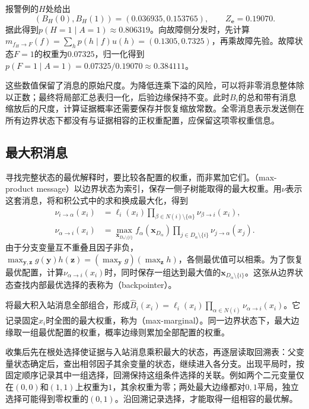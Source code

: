 报警例的$H$处给出
\begin{equation}
  (B_H(0),B_H(1))=(0.036935,0.153765),
  \qquad Z_{\bm{e}}=0.19070.
  \label{eq:pgm-junction-tree-alarm-normalizer}
\end{equation}
据此得到$p(H=1\mid A=1)\approx0.806319$。向故障侧分发时，先计算$m_{f_H\to F}(f)=\sum_h p(h\mid f)u(h)=(0.1305,0.7325)$，再乘故障先验。故障状态$F=1$的权重为$0.07325$，归一化得到$p(F=1\mid A=1)=0.07325/0.19070\approx0.384111$。

这些数值保留了消息的原始尺度。为降低连乘下溢的风险，可以将非零消息整体除以正数；最终将局部汇总表归一化，后验边缘保持不变。此时$B_i$的总和带有消息缩放后的尺度，计算证据概率还需要保存并恢复缩放常数。全零消息表示发送侧在所有边界状态下都没有与证据相容的正权重配置，应保留这项零权重信息。

\subsection{最大积消息}
\label{sec:pgm-junction-tree-max-product}

寻找完整状态的最优解释时，要比较各配置的权重，而非累加它们。（max-product message）以边界状态为索引，保存一侧子树能取得的最大权重。用$\nu$表示这套消息，将和积公式中的求和换成最大化，得到
\begin{equation}
  \begin{aligned}
    \nu_{i\to\alpha}(x_i)
      &=\ell_i(x_i)\prod_{\beta\in N(i)\setminus\{\alpha\}}
         \nu_{\beta\to i}(x_i),\\
    \nu_{\alpha\to i}(x_i)
      &=\max_{\bm{x}_{D_\alpha\setminus\{i\}}}
         f_\alpha(\bm{x}_{D_\alpha})
         \prod_{j\in D_\alpha\setminus\{i\}}
         \nu_{j\to\alpha}(x_j).
  \end{aligned}
  \label{eq:pgm-junction-tree-factor-max}
\end{equation}
由于分支变量互不重叠且因子非负，$\max_{\bm y,\bm z}g(\bm y)h(\bm z)=(\max_{\bm y}g)(\max_{\bm z}h)$，各侧最优值可以相乘。为了恢复最优配置，计算$\nu_{\alpha\to i}(x_i)$时，同时保存一组达到最大值的$\bm{x}_{D_\alpha\setminus\{i\}}$。这张从边界状态查找内部最优选择的表称为（backpointer）。

将最大积入站消息全部组合，形成$\widehat{B}_i(x_i)=\ell_i(x_i)\prod_{\alpha\in N(i)}\nu_{\alpha\to i}(x_i)$。它记录固定$x_i$时全图的最大权重，称为（max-marginal）。同一边界状态下，最大边缘取一组最优配置的权重，概率边缘则累加全部配置的权重。

收集后先在根处选择使证据与入站消息乘积最大的状态，再逐层读取回溯表：父变量状态确定后，查出相邻因子其余变量的状态，继续进入各分支。出现平局时，按固定顺序记录其中一组选择，回溯保持这组条件选择的关联。例如两个二元变量仅在$(0,0)$和$(1,1)$上权重为$1$，其余权重为零；两处最大边缘都对$0,1$平局，独立选择可能得到零权重的$(0,1)$。沿回溯记录选择，才能取得一组相容的最优解。


